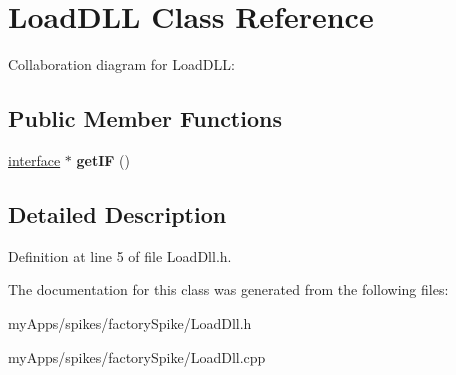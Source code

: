 \hypertarget{classLoadDLL}{}\section{Load\+D\+LL Class Reference}
\label{classLoadDLL}


Collaboration diagram for Load\+D\+LL\+:
\subsection*{Public Member Functions}
\begin{DoxyCompactItemize}
\item 
\mbox{\label{classLoadDLL_a99c0aa649d826cf5bb7e1c7afd02b55b}} 
\mbox{\hyperlink{classinterface}{interface}} $\ast$ {\bfseries get\+IF} ()
\end{DoxyCompactItemize}


\subsection{Detailed Description}


Definition at line 5 of file Load\+Dll.\+h.



The documentation for this class was generated from the following files\+:\begin{DoxyCompactItemize}
\item 
my\+Apps/spikes/factory\+Spike/Load\+Dll.\+h\item 
my\+Apps/spikes/factory\+Spike/Load\+Dll.\+cpp\end{DoxyCompactItemize}
